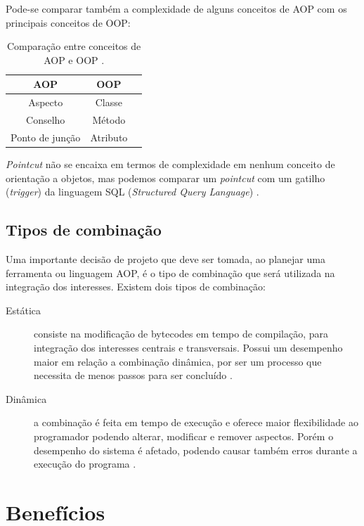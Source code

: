 \documentclass[tc,openright]{iiufrgs}
\begin{document}
Pode-se comparar também a complexidade de alguns conceitos de AOP com os principais conceitos de OOP:

\begin{table}[ht]
	\centering
	\caption{Comparação entre conceitos de AOP e OOP \cite{jacobson2004aspect}.}
	
	\begin{tabular}[h]{c c l}
		\hline 
		\textbf{AOP} & \textbf{OOP} \\
		\hline
		Aspecto&Classe \\
		Conselho&Método \\
		Ponto de junção&Atributo \\
		\hline
	\end{tabular}
	\label{tab:comparacaoAOPOOP}
\end{table}

\textit{Pointcut} não se encaixa em termos de complexidade em nenhum conceito de orientação a objetos, mas podemos comparar um \textit{pointcut} com um gatilho (\textit{trigger}) da linguagem SQL (\textit{Structured Query Language}) \cite{jacobson2004aspect}.

\subsection{Tipos de combinação}

Uma importante decisão de projeto que deve ser tomada, ao planejar uma ferramenta ou linguagem AOP, é o tipo de combinação que será utilizada na integração dos interesses. Existem dois tipos de combinação:

\begin{description}
\item [Estática]  consiste na modificação de bytecodes em tempo de compilação, para integração dos interesses centrais e transversais. Possui um desempenho maior em relação a combinação dinâmica, por ser um processo que necessita de menos passos para ser concluído \cite{steinmacher2003estudo}.
\item [Dinâmica] a combinação é feita em tempo de execução e oferece maior flexibilidade ao programador podendo alterar, modificar e remover aspectos. Porém o desempenho do sistema é afetado, podendo causar também erros durante a execução do programa \cite{steinmacher2003estudo}. 
\end{description}

\section{Benefícios}
\end{document}
